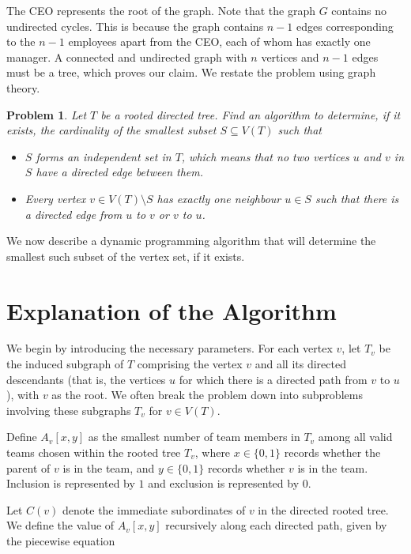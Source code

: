 \documentclass[ a4paper, 11pt]{report}
\theoremstyle{plain}
\newtheorem{problem}[theorem]{Problem}
\theoremstyle{definition}
\begin{document}
The CEO represents the root of the graph. Note that the graph $G$ contains no undirected cycles. This is because the graph contains $n-1$ edges corresponding to the $n-1$ employees apart from the CEO, each of whom has exactly one manager. A connected and undirected graph with $n$ vertices and $n-1$ edges must be a tree, which proves our claim. We restate the problem using graph theory.

\begin{problem}
Let $T$ be a rooted directed tree. Find an algorithm to determine, if it exists, the cardinality of the smallest subset $S \subseteq V(T)$ such that
\begin{itemize}
    \item $S$ forms an independent set in $T$, which means that no two vertices $u$ and $v$ in $S$ have a directed edge between them.
    \item Every vertex $v \in V(T) \setminus S$ has exactly one neighbour $u \in S$ such that there is a directed edge from $u$ to $v$ or $v$ to $u$.
\end{itemize}
\end{problem}

We now describe a dynamic programming algorithm that will determine the smallest such subset of the vertex set, if it exists.

\section{Explanation of the Algorithm}

We begin by introducing the necessary parameters. For each vertex $v$, let $T_v$ be the induced subgraph of $T$ comprising the vertex $v$ and all its directed descendants (that is, the vertices $u$ for which there is a directed path from $v$ to $u$), with $v$ as the root. We often break the problem down into subproblems involving these subgraphs $T_v$ for $v \in V(T)$.
\newline

Define $A_v[x,y]$ as the smallest number of team members in $T_v$ among all valid teams chosen within the rooted tree $T_v$, where $x \in \{0,1\}$ records whether the parent of $v$ is in the team, and $y \in \{0,1\}$ records whether $v$ is in the team. Inclusion is represented by $1$ and exclusion is represented by $0$.
\newline

Let $C(v)$ denote the immediate subordinates of $v$ in the directed rooted tree. We define the value of $A_v[x,y]$ recursively along each directed path, given by the piecewise equation
\end{document}
